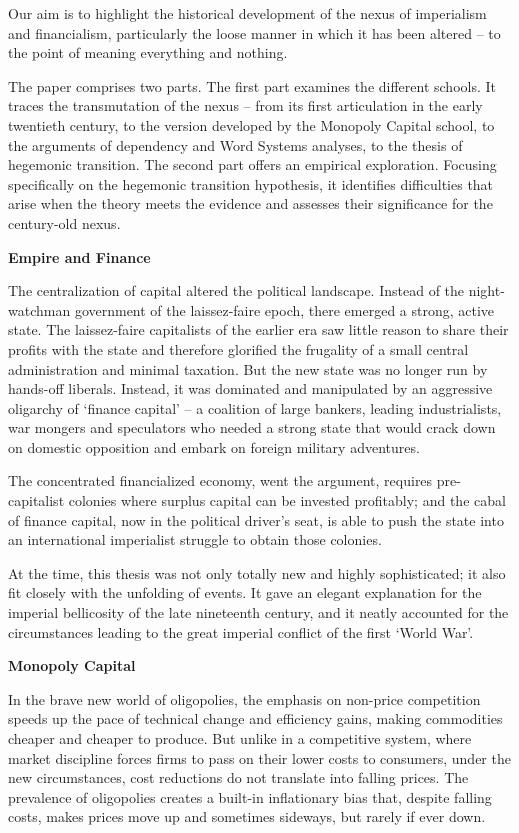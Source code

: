 \documentclass[
]{book}
\begin{document}
Our aim is to highlight the historical development of the
nexus of imperialism and financialism,
particularly the loose manner in which it has been altered --
to the point of meaning everything and nothing.

The paper comprises two parts. The first part examines the different schools. It
traces the transmutation of the nexus -- from its first articulation in the early twentieth
century, to the version developed by the Monopoly Capital school, to the arguments of
dependency and Word Systems analyses, to the thesis of hegemonic transition. The
second part offers an empirical exploration. Focusing specifically on the hegemonic
transition hypothesis, it identifies difficulties that arise when the theory meets the
evidence and assesses their significance for the century-old nexus.

\textbf{Empire and Finance}

The centralization of capital altered the political landscape. Instead of
the night-watchman government of the laissez-faire epoch, there emerged a strong, active
state.
The laissez-faire capitalists of the earlier era saw little reason to share their profits
with the state and therefore glorified the frugality of a small central administration and
minimal taxation. But the new state was no longer run by hands-off liberals. Instead, it was
dominated and manipulated by an aggressive oligarchy of `finance capital' -- a coalition of
large bankers, leading industrialists, war mongers and speculators who needed a strong
state that would crack down on domestic opposition and embark on foreign military
adventures.

The concentrated financialized economy, went the argument, requires pre-capitalist colonies
where surplus capital can be invested profitably; and the cabal of finance capital, now in
the political driver's seat, is able to push the state into an international imperialist
struggle to obtain those colonies.

At the time, this thesis was not only totally new and highly sophisticated; it also
fit closely with the unfolding of events. It gave an elegant explanation for the imperial
bellicosity of the late nineteenth century, and it neatly accounted for the circumstances
leading to the great imperial conflict of the first `World War'.

\textbf{Monopoly Capital}

In the brave new world of oligopolies, the emphasis on non-price competition
speeds up the pace of technical change and efficiency gains, making commodities cheaper
and cheaper to produce. But unlike in a competitive system, where market discipline
forces firms to pass on their lower costs to consumers, under the new circumstances, cost
reductions do not translate into falling prices. The prevalence of oligopolies creates a
built-in inflationary bias that, despite falling costs, makes prices move up and sometimes
sideways, but rarely if ever down.
\end{document}
